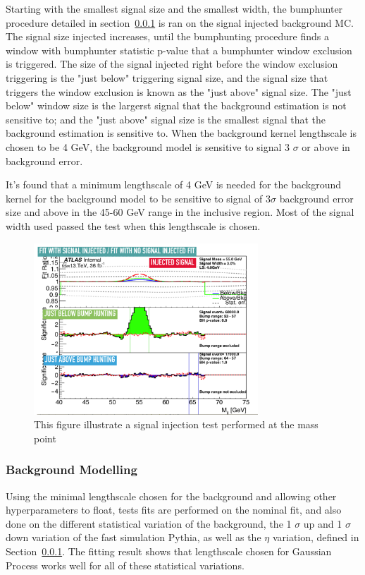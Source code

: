 \begin{itemize}
Starting with the smallest signal size and the smallest width, the bumphunter procedure detailed in section~\ref{} is ran on the signal injected background MC. The signal size injected increases, until the bumphunting procedure finds a window with bumphunter statistic p-value  that a bumphunter window exclusion is triggered. The size of the signal injected right before the window exclusion triggering is the "just below"
triggering signal size, and the signal size that triggers the window exclusion is known as the "just above" signal size. The "just below"
window size is the largerst signal that the background estimation is not sensitive to; and the "just above" signal size is the smallest signal that the background estimation is sensitive to. When the background kernel lengthscale is chosen to be 4 GeV, the background model is sensitive to signal 3 $\sigma$ or above in background error. 

It's found that a minimum lengthscale of 4 GeV is needed for the background kernel for the background model to be sensitive to signal of 3$\sigma$ background error size and above in the 45-60 GeV range in the inclusive region. Most of the signal width used passed the test when this lengthscale is chosen. 

\begin{figure}[!htb]
    \begin{center}
        \includegraphics[width=0.75\textwidth]{figures/chapter_dimuon/signalInjection}        
        \caption{
        This figure illustrate a signal injection test performed at the mass point  }
            \label{fig:dimuonstudies}
    \end{center}
\end{figure}

\subsubsection{Background Modelling}
Using the minimal lengthscale chosen for the background and allowing other hyperparameters to float, tests fits are performed on the nominal fit, and also done on the different statistical variation of the background, the 1 $\sigma$ up and 1 $\sigma$ down variation of the fast simulation Pythia, as well as the $\eta$ variation, defined in Section~\ref{}.
The fitting result shows that lengthscale chosen for Gaussian Process works well for all of these statistical variations. 


\end{itemize}
